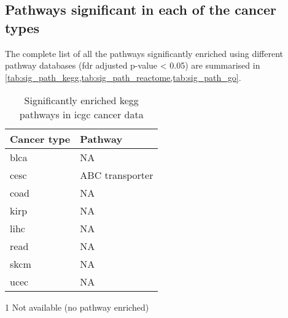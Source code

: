\begin{appendices}
\section{Pathways significant in each of the cancer types}
\label{sec:pathways_significant_in_each_of_the_cancer_types}

The complete list of all the pathways significantly enriched using different pathway databases (\gls{fdr} adjusted p-value \textless{} 0.05) are summarised in \cref{tab:sig_path_kegg,tab:sig_path_reactome,tab:sig_path_go}.

\begin{table}[htpb]
	\centering
	\caption{Significantly enriched \gls{kegg} pathways in \gls{icgc} cancer data}
	\label{tab:sig_path_kegg}
	\begin{threeparttable}
		\begin{tabular}{ll}
			Cancer type                      & Pathway         \\
			\hline
			\hline
				\rule{0pt}{2.25ex}\gls{blca} & NA\tnote{1}             \\
				\gls{cesc}                   & ABC transporter \\
				\gls{coad}                   & NA              \\
				\gls{kirp}                   & NA              \\
				\gls{lihc}                   & NA              \\
				\gls{read}                   & NA              \\
				\gls{skcm}                   & NA              \\
				\gls{ucec}                   & NA              \\
			\hline
			\hline
		\end{tabular}
		\begin{tablenotes}
			\begin{footnotesize}
				\item [1] Not available (no pathway enriched)
			\end{footnotesize}
		\end{tablenotes}
	\end{threeparttable}
\end{table}


\end{appendices}
